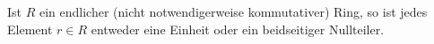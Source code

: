\begin{itemize}
    \begin{corollary}
      Ist $R$ ein endlicher \textup(nicht notwendigerweise kommutativer\textup) Ring, so ist jedes Element $r \in R$ entweder eine Einheit oder ein beidseitiger Nullteiler.
    \end{corollary}


    
\end{itemize}





\addtocounter{subsection}{1}





\addtocounter{subsection}{1}





\addtocounter{subsection}{1}





\addtocounter{subsection}{1}





\addtocounter{subsection}{1}




